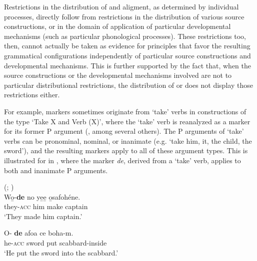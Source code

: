 \documentclass[output=paper]{langsci/langscibook}
\begin{document}
Restrictions in the distribution of  and  aligment,
as determined by individual processes, directly follow from  restrictions in the distribution of
various source constructions, or in the domain of application of particular developmental mechanisms (such as particular phonological processes). These restrictions too, then, cannot actually
be taken as evidence  for principles that favor the resulting
grammatical configurations independently of particular source
constructions and developmental mechanisms. This is further
supported by the fact that, when the source constructions or the
developmental mechanisms involved are not  to particular
distributional restrictions, the distribution of  or
  does not display those restrictions either.

For example, 
markers sometimes originate from  `take' verbs in constructions of the type `Take
X and Verb (X)', where the `take' verb is reanalyzed as a marker
for its former
       P argument (\citealt{Lord1993,Chappell2013}, among
         several others). The P arguments of `take' verbs can be pronominal, nominal,  or inanimate (e.g. `take him, it, the child, the sword'), 
and the resulting  markers apply to all of these
argument types. This is illustrated for  
in 
 ,
where the  marker {\em de},
         derived from a `take' verb, applies to both  and inanimate P arguments.



\ea\label{twi}
 (; )\\
\ea
\gll Wo̱-\textbf{{de}} no ye̱e̱ o̱safohéne.\\
they-\textsc{acc} him make captain\\
\glt `They made him captain.' 

\ex
\gll O-\textbf{{ de}} afoa ce boha-m.\\
he-\textsc{acc} sword put scabbard-inside\\
\glt `He put the sword into the scabbard.' 

\z
\z
\end{document}
